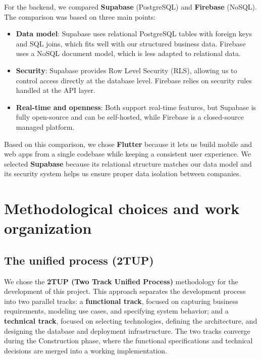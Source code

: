 For the backend, we compared \textbf{Supabase} (PostgreSQL) and \textbf{Firebase} (NoSQL). The comparison was based on three main points:
\begin{itemize}
    \item \textbf{Data model}: Supabase uses relational PostgreSQL tables with foreign keys and SQL joins, which fits well with our structured business data. Firebase \cite{FirebaseDocs} uses a NoSQL document model, which is less adapted to relational data.
    \item \textbf{Security}: Supabase provides Row Level Security (RLS), allowing us to control access directly at the database level. Firebase relies on security rules handled at the API layer.
    \item \textbf{Real-time and openness}: Both support real-time features, but Supabase is fully open-source and can be self-hosted, while Firebase is a closed-source managed platform.
\end{itemize}

Based on this comparison, we chose \textbf{Flutter} because it lets us build mobile and web apps from a single codebase while keeping a consistent user experience. We selected \textbf{Supabase} because its relational structure matches our data model and its security system helps us ensure proper data isolation between companies.

\vspace{-0.5cm}
\section{Methodological choices and work organization}

\subsection{The unified process (2TUP)}

We chose the \textbf{2TUP (Two Track Unified Process)} methodology \cite{Rocher2003} for the development of this project. This approach separates the development process into two parallel tracks: a \textbf{functional track}, focused on capturing business requirements, modeling use cases, and specifying system behavior; and a \textbf{technical track}, focused on selecting technologies, defining the architecture, and designing the database and deployment infrastructure. The two tracks converge during the Construction phase, where the functional specifications and technical decisions are merged into a working implementation.

